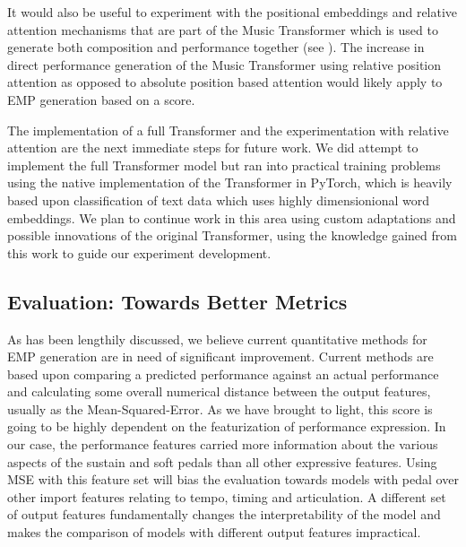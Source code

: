 It would also be useful to experiment with the positional embeddings and relative attention mechanisms that are part of the Music Transformer \cite{huang2018music} which is used to generate both composition and performance together (see ). The increase in direct performance generation of the Music Transformer using relative position attention as opposed to absolute position based attention would likely apply to EMP generation based on a score.  

The implementation of a full Transformer and the experimentation with relative attention are the next immediate steps for future work. We did attempt to implement the full Transformer model but ran into practical training problems using the native implementation of the Transformer in PyTorch, which is heavily based upon classification of text data which uses highly dimensionional word embeddings. We plan to continue work in this area using custom adaptations and possible innovations of the original Transformer, using the knowledge gained from this work to guide our experiment development. 

\subsection{Evaluation: Towards Better Metrics}
As has been lengthily discussed, we believe current quantitative methods for EMP generation are in need of significant improvement. Current methods are based upon comparing a predicted performance against an actual performance and calculating some overall numerical distance between the output features, usually as the Mean-Squared-Error. As we have brought to light, this score is going to be highly dependent on the featurization of performance expression. In our case, the performance features carried more information about the various aspects of the sustain and soft pedals than all other expressive features. Using MSE with this feature set will bias the evaluation towards models with pedal over other import features relating to tempo, timing and articulation. A different set of output features fundamentally changes the interpretability of the model and makes the comparison of models with different output features impractical. 

